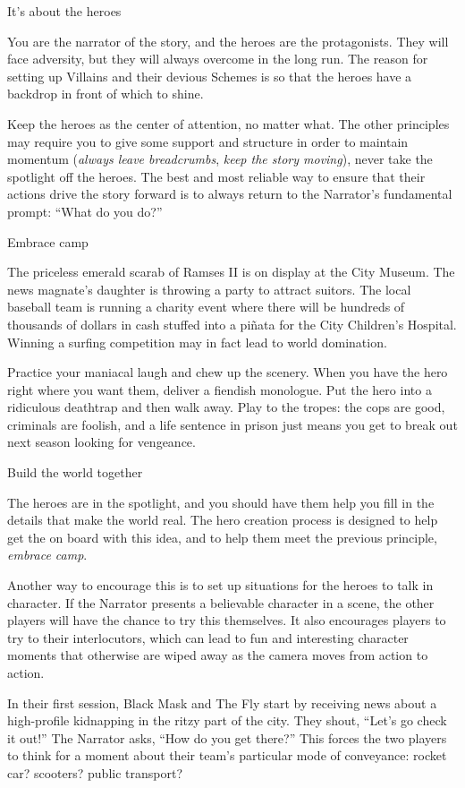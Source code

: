 \begin{principle}{It's about the heroes}
{
You are the narrator of the story, and the heroes are the protagonists.
They will face adversity, but they will always overcome in the long run.
The reason for setting up Villains and their devious Schemes is so
that the heroes have a backdrop in front of which to shine.

Keep the heroes as the center of attention, no matter what.  The other
principles may require you to give some support and structure in order
to maintain momentum (\emph{always leave breadcrumbs}, \emph{keep the
  story moving}), never take the spotlight off the heroes.
The best and most reliable way to ensure that their actions drive
the story forward is to always return to the Narrator's fundamental
prompt: ``What do you do?''
}
\end{principle}

\begin{principle}{Embrace camp}
{
The priceless emerald scarab of Ramses II is on display at the City
Museum.
The news magnate's daughter is throwing a party to attract suitors.
The local baseball team is running a charity event where there will
be hundreds of thousands of dollars in cash stuffed into a pi\~nata
for the City Children's Hospital.
Winning a surfing competition may in fact lead to world domination.

Practice your maniacal laugh and chew up the scenery.
When you have the hero right where you want them, deliver a fiendish
monologue.
Put the hero into a ridiculous deathtrap and then walk away.
Play to the tropes: the cops are good, criminals are foolish,
and a life sentence in prison just means you get to break out next
season looking for vengeance.
}
\end{principle}


\begin{principle}{Build the world together}
{
The heroes are in the spotlight, and you should have them help
you fill in the details that make the world real.
The hero creation process is designed to help get the on board
with this idea, and to help them meet the previous
principle, \textit{embrace camp}.

Another way to encourage this is to set up situations for the
heroes to talk in character. If the Narrator presents a believable
character in a scene, the other players will have the chance
to try this themselves. It also encourages players to try
to  their interlocutors, which can lead to
fun and interesting character moments that otherwise are wiped
away as the camera moves from action to action.

\begin{example}
  In their first session, Black Mask and The Fly start by receiving
  news about a high-profile kidnapping in the ritzy part of the city.
  They shout, ``Let's go check it out!'' The Narrator asks, ``How do
  you get there?'' This forces the two players to think for a moment
  about their team's particular mode of conveyance: rocket car?
  scooters? public transport?
\end{example}
}
\end{principle}



